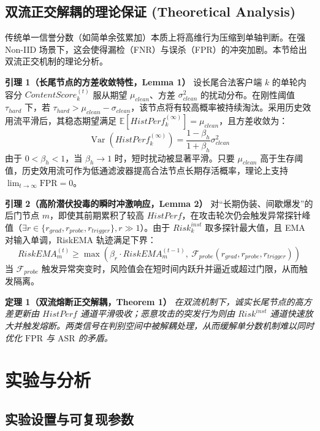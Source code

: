 \documentclass[11pt, a4paper, UTF8, fontset=fandol]{ctexart}
\begin{document}
\subsection{双流正交解耦的理论保证 (Theoretical Analysis)}
传统单一信誉分数（如简单余弦累加）本质上将高维行为压缩到单轴判断。在强 Non-IID 场景下，这会使得漏检（FNR）与误杀（FPR）的冲突加剧。本节给出双流正交机制的理论分析。

\textbf{引理 1（长尾节点的方差收敛特性，Lemma 1）}
设长尾合法客户端 $k$ 的单轮内容分 $ContentScore_{k}^{(t)}$ 服从期望 $\mu_{clean}$、方差 $\sigma_{clean}^2$ 的扰动分布。在刚性阈值 $\tau_{hard}$ 下，若 $\tau_{hard} > \mu_{clean} - \sigma_{clean}$，该节点将有较高概率被持续淘汰。采用历史效用流平滑后，其稳态期望满足 $\mathbb{E}[HistPerf_k^{(\infty)}] = \mu_{clean}$，且方差收敛为：
\begin{equation}
    \operatorname{Var}(HistPerf_{k}^{(\infty)}) = \frac{1-\beta_h}{1+\beta_h} \sigma_{clean}^{2}
\end{equation}
由于 $0 < \beta_h < 1$，当 $\beta_h \to 1$ 时，短时扰动被显著平滑。只要 $\mu_{clean}$ 高于生存阈值，历史效用流可作为低通滤波器提高合法节点长期存活概率，理论上支持 $\lim_{t \to \infty} \text{FPR} = 0$。

\textbf{引理 2（高阶潜伏投毒的瞬时冲激响应，Lemma 2）}
对“长期伪装、间歇爆发”的后门节点 $m$，即使其前期累积了较高 $HistPerf$，在攻击轮次仍会触发异常探针峰值（$\exists r \in \{r_{grad}, r_{probe}, r_{trigger}\}, r \gg 1$）。由于 $Risk_k^{inst}$ 取多探针最大值，且 EMA 对输入单调，RiskEMA 轨迹满足下界：
\begin{equation}
    RiskEMA_m^{(t)} \ge \max \left( \beta_r \cdot RiskEMA_m^{(t-1)},\ \mathcal{F}_{probe}(r_{grad}, r_{probe}, r_{trigger}) \right)
\end{equation}
当 $\mathcal{F}_{probe}$ 触发异常突变时，风险值会在短时间内跃升并逼近或超过门限，从而触发隔离。

\textbf{定理 1（双流熔断正交解耦，Theorem 1）}
\textit{在双流机制下，诚实长尾节点的高方差更新由 $HistPerf$ 通道平滑吸收；恶意攻击的突发行为则由 $Risk^{inst}$ 通道快速放大并触发熔断。两类信号在判别空间中被解耦处理，从而缓解单分数机制难以同时优化 $\text{FPR}$ 与 $\text{ASR}$ 的矛盾。}

\section{实验与分析}
\label{sec:experiments}
\subsection{实验设置与可复现参数}
\end{document}
